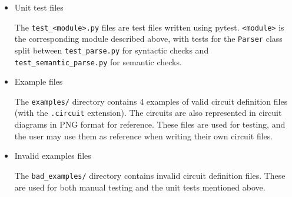 \begin{itemize}
\item Unit test files

  The \texttt{test\_<module>.py} files are test files written using pytest.
  \texttt{<module>} is the corresponding module described above,
  with tests for the \texttt{Parser} class split between
  \texttt{test\_parse.py} for syntactic checks and
  \texttt{test\_semantic\_parse.py} for semantic checks.


\item Example files

  The \texttt{examples/} directory contains 4 examples of valid
  circuit definition files (with the \texttt{.circuit} extension).
  The circuits are also represented in circuit diagrams in PNG format
  for reference. These files are used for testing, and the user
  may use them as reference when writing their own circuit files.

\item Invalid examples files

  The \texttt{bad\_examples/} directory contains invalid circuit
  definition files. These are used for both manual testing and
  the unit tests mentioned above.
\end{itemize}
